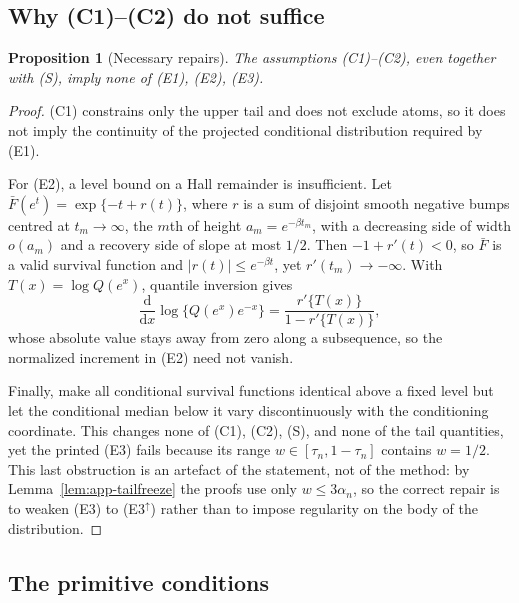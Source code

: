 \documentclass[bj,authoryear]{imsart}
\theoremstyle{plain}
\newtheorem{proposition}[theorem]{Proposition}
\begin{document}
\begin{appendix}
\subsection{Why (C1)--(C2) do not suffice}

\begin{proposition}[Necessary repairs]\label{prop:app-necessary}
The assumptions (C1)--(C2), even together with (S), imply none of (E1),
(E2), (E3).
\end{proposition}

\begin{proof}
(C1) constrains only the upper tail and does not exclude atoms, so it
does not imply the continuity of the projected conditional distribution
required by (E1).

For (E2), a level bound on a Hall remainder is insufficient. Let
$\bar F(e^t)=\exp\{-t+r(t)\}$, where $r$ is a sum of disjoint smooth
negative bumps centred at $t_m\to\infty$, the $m$th of height
$a_m=e^{-\beta t_m}$, with a decreasing side of width $o(a_m)$ and a
recovery side of slope at most $1/2$. Then $-1+r'(t)<0$, so $\bar F$ is
a valid survival function and $|r(t)|\le e^{-\beta t}$, yet
$r'(t_m)\to-\infty$. With $T(x)=\log Q(e^x)$, quantile inversion gives
\[
 \frac{\mathrm d}{\mathrm dx}\log\{Q(e^x)e^{-x}\}
 =\frac{r'\{T(x)\}}{1-r'\{T(x)\}},
\]
whose absolute value stays away from zero along a subsequence, so the
normalized increment in (E2) need not vanish.

Finally, make all conditional survival functions identical above a fixed
level but let the conditional median below it vary discontinuously with
the conditioning coordinate. This changes none of (C1), (C2), (S), and
none of the tail quantities, yet the printed (E3) fails because its
range $w\in[\tau_n,1-\tau_n]$ contains $w=1/2$. This last obstruction is
an artefact of the statement, not of the method: by
Lemma~\ref{lem:app-tailfreeze} the proofs use only $w\le3\alpha_n$, so
the correct repair is to weaken (E3) to (E3$^\uparrow$) rather than to
impose regularity on the body of the distribution.
\end{proof}

\subsection{The primitive conditions}


\end{appendix}
\end{document}

